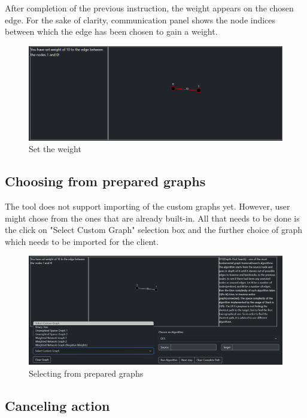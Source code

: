 After completion of the previous instruction, the weight appears on the chosen edge. For the sake of clarity, communication panel shows the node indices between which the edge has been chosen to gain a weight.

\begin{figure}[H]
	\centering
	\includegraphics[width=\textwidth]{images/set_the_weight.png}
	\caption{Set the weight}
\end{figure}

\subsection{Choosing from prepared graphs}

The tool does not support importing of the custom graphs yet. However, user might chose from the ones that are already built-in. All that needs to be done is the click on "Select Custom Graph" selection box and the further choice of graph which needs to be imported for the client.

\begin{figure}[H]
	\centering
	\includegraphics[width=\textwidth]{images/selecting_prepared_graph.png}
	\caption{Selecting from prepared graphs}
\end{figure}

\subsection{Canceling action}

